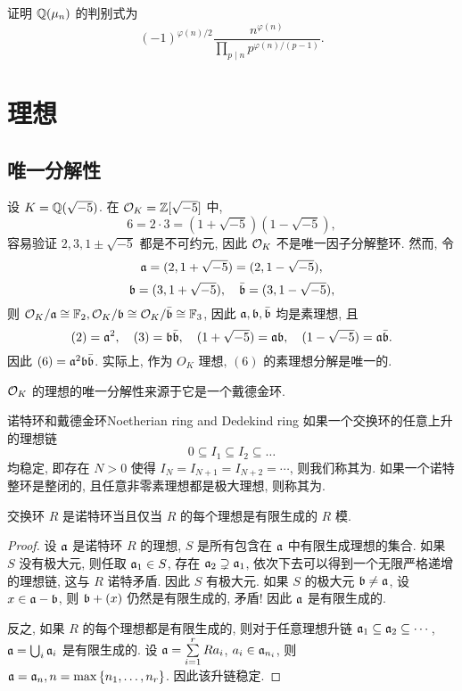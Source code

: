 \begin{exercise}
证明 ${\mathbb{Q}}(\mu_n)$ 的判别式为
	\[(-1)^{\varphi(n)/2}\frac{n^{\varphi(n)}}{\prod_{p\mid n}p^{\varphi(n)/(p-1)}}.\]
\end{exercise}



\section{理想}

\subsection{唯一分解性}
\begin{example}
设 $K={\mathbb{Q}}(\sqrt{-5})$. 在 ${\mathcal{O}}_K={\mathbb{Z}}[\sqrt{-5}]$ 中,
  \[6=2\cdot 3=(1+\sqrt{-5})(1-\sqrt{-5}),\]
容易验证 $2,3,1\pm\sqrt{-5}$ 都是不可约元, 因此 ${\mathcal{O}}_K$ 不是唯一因子分解整环. 然而, 令 
  \[{\mathfrak{a}}=(2,1+\sqrt{-5})=(2,1-\sqrt{-5}), \]
  \[{\mathfrak{b}}=(3,1+\sqrt{-5}),\quad \bar {{\mathfrak{b}}}=(3,1-\sqrt{-5}),\]
则 ${\mathcal{O}}_K/{\mathfrak{a}}\cong {\mathbb{F}}_2,{\mathcal{O}}_K/{\mathfrak{b}}\cong {\mathcal{O}}_K/\bar {{\mathfrak{b}}}\cong {\mathbb{F}}_3$, 因此 ${\mathfrak{a}},{\mathfrak{b}},\bar {{\mathfrak{b}}}$ 均是素理想, 且
  \[(2)={\mathfrak{a}}^2,\quad (3)={\mathfrak{b}}\bar {{\mathfrak{b}}},\quad (1+\sqrt{-5})={\mathfrak{a}}{\mathfrak{b}},\quad (1-\sqrt{-5})={\mathfrak{a}}\bar{{\mathfrak{b}}}.\]
因此 $(6)={\mathfrak{a}}^2 {\mathfrak{b}}\bar{{\mathfrak{b}}}$. 实际上, 作为 $O_K$ 理想, $(6)$ 的素理想分解是唯一的.
\end{example}

${\mathcal{O}}_K$ 的理想的唯一分解性来源于它是一个戴德金环.

\begin{definition}{诺特环和戴德金环}{Noetherian ring and Dedekind ring}
如果一个交换环的任意上升的理想链
  \[0\subseteq I_1\subseteq I_2\subseteq \dots \]
均稳定, 即存在 $N>0$ 使得 $I_N=I_{N+1}=I_{N+2}=\cdots$, 则我们称其为. 
如果一个诺特整环是整闭的, 且任意非零素理想都是极大理想, 则称其为.
\end{definition}

\begin{proposition}{}{}
交换环 $R$ 是诺特环当且仅当 $R$ 的每个理想是有限生成的 $R$ 模.
\end{proposition}
\begin{proof}
设 ${\mathfrak{a}}$ 是诺特环 $R$ 的理想, $S$ 是所有包含在 ${\mathfrak{a}}$ 中有限生成理想的集合. 如果 $S$ 没有极大元, 则任取 ${\mathfrak{a}}_1\in S$, 存在 ${\mathfrak{a}}_2\supsetneq {\mathfrak{a}}_1$, 依次下去可以得到一个无限严格递增的理想链, 这与 $R$ 诺特矛盾. 因此 $S$ 有极大元. 如果 $S$ 的极大元 ${\mathfrak{b}}\neq {\mathfrak{a}}$, 设 $x\in{\mathfrak{a}}-{\mathfrak{b}}$, 则 ${\mathfrak{b}}+(x)$ 仍然是有限生成的, 矛盾! 因此 ${\mathfrak{a}}$ 是有限生成的.

反之, 如果 $R$ 的每个理想都是有限生成的, 则对于任意理想升链 ${\mathfrak{a}}_1\subseteq {\mathfrak{a}}_2\subseteq \cdots$, ${\mathfrak{a}}=\bigcup_i{\mathfrak{a}}_i$ 是有限生成的. 设 ${\mathfrak{a}}=\sum\limits_{i=1}^r Ra_i$, $a_i\in {\mathfrak{a}}_{n_i}$, 则 ${\mathfrak{a}}={\mathfrak{a}}_n,n=\max\left\{n_1,\dots,n_r\right\}$. 因此该升链稳定.
\end{proof}


